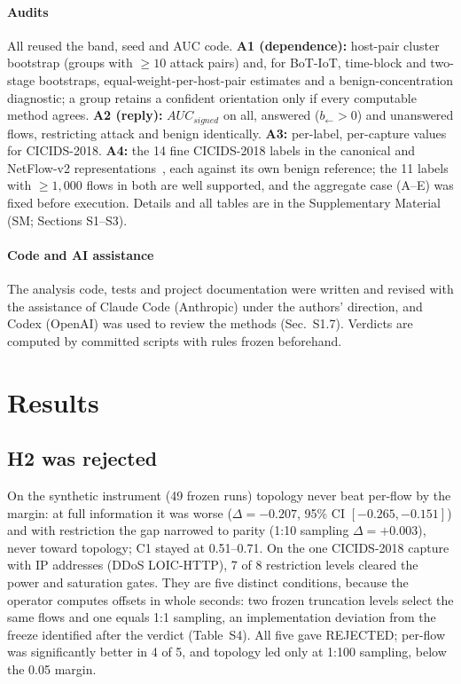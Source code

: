 \documentclass[preprint,12pt]{elsarticle}
\begin{document}
\paragraph{Audits} All reused the band, seed and AUC code. \textbf{A1 (dependence):} host-pair cluster bootstrap (groups with $\ge10$ attack pairs) and, for BoT-IoT, time-block and two-stage bootstraps, equal-weight-per-host-pair estimates and a benign-concentration diagnostic; a group retains a confident orientation only if every computable method agrees. \textbf{A2 (reply):} $AUC_{signed}$ on all, answered ($b_{\leftarrow}>0$) and unanswered flows, restricting attack and benign identically. \textbf{A3:} per-label, per-capture values for CICIDS-2018. \textbf{A4:} the 14 fine CICIDS-2018 labels in the canonical and NetFlow-v2 representations~\cite{sarhan2021nfv2}, each against its own benign reference; the 11 labels with $\ge1{,}000$ flows in both are well supported, and the aggregate case (A--E) was fixed before execution. Details and all tables are in the Supplementary Material (SM; Sections S1--S3).

\paragraph{Code and AI assistance} The analysis code, tests and project documentation were written and revised with the assistance of Claude Code (Anthropic) under the authors' direction, and Codex (OpenAI) was used to review the methods (Sec.~S1.7). Verdicts are computed by committed scripts with rules frozen beforehand.

\section{Results}\label{sec:results}

\subsection{H2 was rejected}\label{sec:h2}

On the synthetic instrument (49 frozen runs) topology never beat per-flow by the margin: at full information it was worse ($\Delta=-0.207$, 95\% CI $[-0.265,-0.151]$) and with restriction the gap narrowed to parity (1:10 sampling $\Delta=+0.003$), never toward topology; C1 stayed at 0.51--0.71. On the one CICIDS-2018 capture with IP addresses (DDoS LOIC-HTTP), 7 of 8 restriction levels cleared the power and saturation gates. They are five distinct conditions, because the operator computes offsets in whole seconds: two frozen truncation levels select the same flows and one equals 1:1 sampling, an implementation deviation from the freeze identified after the verdict (Table~S4). All five gave REJECTED; per-flow was significantly better in 4 of 5, and topology led only at 1:100 sampling, below the 0.05 margin.
\end{document}

